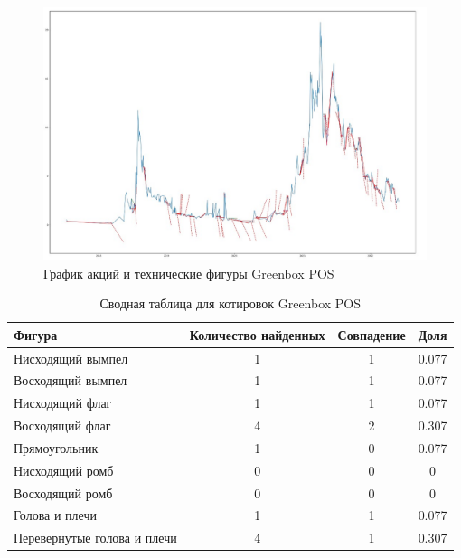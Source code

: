 \documentclass[bachelor, och, coursework]{SCWorks}
\begin{document}
    \begin{figure}[H]
        \centering
        \includegraphics[width=\textwidth]{pic/GBOX.jpg}
        \caption{График акций и технические фигуры Greenbox POS}
    \end{figure}
   
    \begin{table}[!hbt]
        \caption{Сводная таблица для котировок Greenbox POS}
        \centering
        \begin{tabular}{|l|c|c|c|}
        \hline
        Фигура                      & \multicolumn{1}{l|}{Количество найденных} & Совпадение & Доля  \\ \hline
        Нисходящий вымпел           & 1                                         & 1          & 0.077 \\ \hline
        Восходящий вымпел           & 1                                         & 1          & 0.077 \\ \hline
        Нисходящий флаг             & 1                                         & 1          & 0.077 \\ \hline
        Восходящий флаг             & 4                                         & 2          & 0.307 \\ \hline
        Прямоугольник               & 1                                         & 0          & 0.077 \\ \hline
        Нисходящий ромб             & 0                                         & 0          & 0     \\ \hline
        Восходящий ромб             & 0                                         & 0          & 0     \\ \hline
        Голова и плечи              & 1                                         & 1          & 0.077 \\ \hline
        Перевернутые голова и плечи & 4                                         & 1          & 0.307 \\ \hline
        \end{tabular}   
    \end{table}
\end{document}
